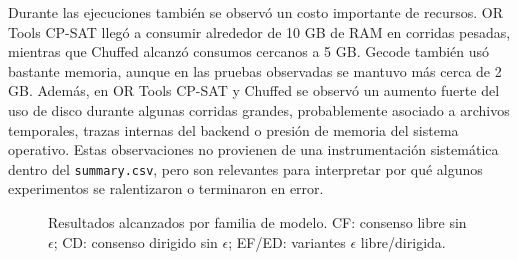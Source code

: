 \documentclass[10pt,letterpaper]{article}
\begin{document}
Durante las ejecuciones tambi\'en se observ\'o un costo importante de recursos. OR Tools CP-SAT lleg\'o a consumir alrededor de 10 GB de RAM en corridas pesadas, mientras que Chuffed alcanz\'o consumos cercanos a 5 GB. Gecode tambi\'en us\'o bastante memoria, aunque en las pruebas observadas se mantuvo m\'as cerca de 2 GB. Adem\'as, en OR Tools CP-SAT y Chuffed se observ\'o un aumento fuerte del uso de disco durante algunas corridas grandes, probablemente asociado a archivos temporales, trazas internas del backend o presi\'on de memoria del sistema operativo. Estas observaciones no provienen de una instrumentaci\'on sistem\'atica dentro del \texttt{summary.csv}, pero son relevantes para interpretar por qu\'e algunos experimentos se ralentizaron o terminaron en error.

\begin{figure}[H]
\centering
{}
\caption{Resultados alcanzados por familia de modelo. CF: consenso libre sin \(\epsilon\); CD: consenso dirigido sin \(\epsilon\); EF/ED: variantes \(\epsilon\) libre/dirigida.}
\label{fig:resultados-por-modelo}
\end{figure}
\end{document}
